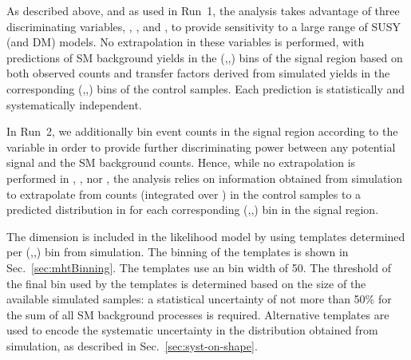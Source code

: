 As described above, and as used in Run~1, the analysis takes advantage
of three discriminating variables, \njet, \nb, and \HT, to provide
sensitivity to a large range of SUSY (and DM) models. No extrapolation
in these variables is performed, with predictions of SM background
yields in the (\njet,\nb,\HT) bins of the signal region based on both
observed counts and transfer factors derived from simulated yields in
the corresponding (\njet,\nb,\HT) bins of the control samples. Each
prediction is statistically and systematically independent.


In Run~2, we additionally bin event counts in the signal region
according to the variable \mht in order to provide further
discriminating power between any potential signal and the SM
background counts. Hence, while no extrapolation is performed in
\njet, \nb, nor \HT, the analysis relies on information obtained
from simulation to extrapolate from counts (integrated over \mht) in
the control samples to a predicted distribution in \mht for each
corresponding (\njet,\nb,\HT) bin in the signal region.

The \mht dimension is included in the likelihood model by using
templates determined per (\njet,\nb,\HT) bin from simulation. 
The binning of the templates is shown in Sec.~\ref{sec:mhtBinning}. 
The templates use an \mht bin width of 50\gev. The threshold of the final
\mht bin used by the templates is determined based on the size of the
available simulated samples: a statistical uncertainty of not more
than 50\% for the sum of all SM background processes is required. 
Alternative templates are used to encode
the systematic uncertainty in the \mht distribution obtained from
simulation, as described in Sec.~\ref{sec:syst-on-shape}. 


